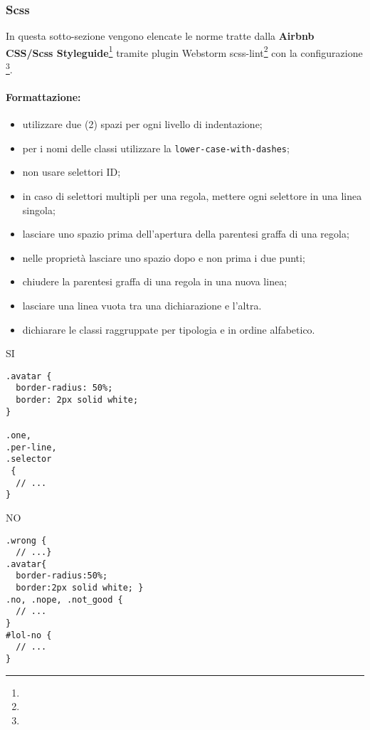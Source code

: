\documentclass[../ProcessiPrimari.tex]{subfiles}
\begin{document}
	
\subsubsection{Scss}
In questa sotto-sezione vengono elencate le norme tratte dalla \textbf{Airbnb\\ CSS/Scss Styleguide}\footnote{} tramite plugin Webstorm scss-lint\footnote{} con la configurazione \footnote{}.
\paragraph*{Formattazione:}
\begin{itemize}
	\item utilizzare due (2) spazi per ogni livello di indentazione;
	\item per i nomi delle classi utilizzare la \texttt{lower-case-with-dashes};
	\item non usare selettori ID;
	\item in caso di selettori multipli per una regola, mettere ogni selettore in una linea singola;
	\item lasciare uno spazio prima dell'apertura della parentesi graffa di una regola;
	\item nelle proprietà lasciare uno spazio dopo e non prima i due punti;
	\item chiudere la parentesi graffa di una regola in una nuova linea;
	\item lasciare una linea vuota tra una dichiarazione e l'altra.
	\item dichiarare le classi raggruppate per tipologia e in ordine alfabetico.
\end{itemize}
\begin{center}{
\begin{minipage}{6cm}
{\begin{center}SI\end{center}}
\begin{Verbatim}[frame=single]
.avatar {
  border-radius: 50%;
  border: 2px solid white;
}

.one,
.per-line,
.selector
 {
  // ...
}
\end{Verbatim}
\end{minipage}
\hfil
\begin{minipage}{7cm}
{\begin{center}NO\end{center}}
\begin{Verbatim}[frame=single]
.wrong {
  // ...}
.avatar{
  border-radius:50%;
  border:2px solid white; }
.no, .nope, .not_good {
  // ...
}
#lol-no {
  // ...
}

\end{Verbatim}
\end{minipage}
}
\end{center}
\end{document}
